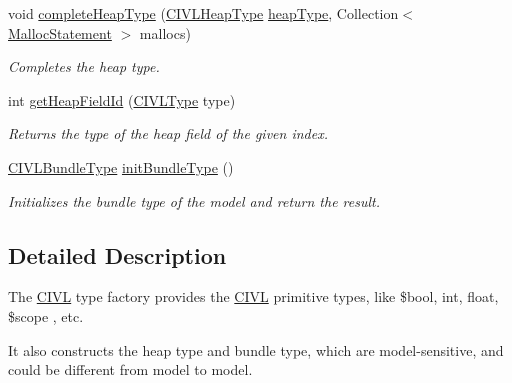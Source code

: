 \begin{DoxyCompactItemize}
void \hyperlink{interfaceedu_1_1udel_1_1cis_1_1vsl_1_1civl_1_1model_1_1IF_1_1CIVLTypeFactory_af8039e88923ed7905b59426add7d5e74}{complete\+Heap\+Type} (\hyperlink{interfaceedu_1_1udel_1_1cis_1_1vsl_1_1civl_1_1model_1_1IF_1_1type_1_1CIVLHeapType}{C\+I\+V\+L\+Heap\+Type} \hyperlink{interfaceedu_1_1udel_1_1cis_1_1vsl_1_1civl_1_1model_1_1IF_1_1CIVLTypeFactory_a535ddc63fe176a188a785e3298ccb18d}{heap\+Type}, Collection$<$ \hyperlink{interfaceedu_1_1udel_1_1cis_1_1vsl_1_1civl_1_1model_1_1IF_1_1statement_1_1MallocStatement}{Malloc\+Statement} $>$ mallocs)
\begin{DoxyCompactList}\small\item\em Completes the heap type. \end{DoxyCompactList}\item 
int \hyperlink{interfaceedu_1_1udel_1_1cis_1_1vsl_1_1civl_1_1model_1_1IF_1_1CIVLTypeFactory_ac0689896cc71dc61590735f807b89d31}{get\+Heap\+Field\+Id} (\hyperlink{interfaceedu_1_1udel_1_1cis_1_1vsl_1_1civl_1_1model_1_1IF_1_1type_1_1CIVLType}{C\+I\+V\+L\+Type} type)
\begin{DoxyCompactList}\small\item\em Returns the type of the heap field of the given index. \end{DoxyCompactList}\item 
\hyperlink{interfaceedu_1_1udel_1_1cis_1_1vsl_1_1civl_1_1model_1_1IF_1_1type_1_1CIVLBundleType}{C\+I\+V\+L\+Bundle\+Type} \hyperlink{interfaceedu_1_1udel_1_1cis_1_1vsl_1_1civl_1_1model_1_1IF_1_1CIVLTypeFactory_a4ab583c20d72f5e41df23b7a5e846475}{init\+Bundle\+Type} ()
\begin{DoxyCompactList}\small\item\em Initializes the bundle type of the model and return the result. \end{DoxyCompactList}\end{DoxyCompactItemize}


\subsection{Detailed Description}
The \hyperlink{classedu_1_1udel_1_1cis_1_1vsl_1_1civl_1_1CIVL}{C\+I\+V\+L} type factory provides the \hyperlink{classedu_1_1udel_1_1cis_1_1vsl_1_1civl_1_1CIVL}{C\+I\+V\+L} primitive types, like {\ttfamily \$bool}, {\ttfamily int}, {\ttfamily float}, {\ttfamily \$scope} , etc. 

It also constructs the heap type and bundle type, which are model-\/sensitive, and could be different from model to model.

